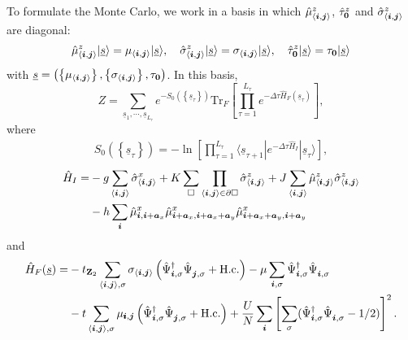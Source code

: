To formulate the Monte Carlo, we work in a basis in which  $\hat{\mu}^{z}_{ \langle  \boldsymbol{i}, \boldsymbol{j} \rangle }$,  $ \hat{\tau}^{z}_{   \boldsymbol{0} } $  and  $ \hat{\sigma}^{z}_{ \langle  \boldsymbol{i}, \boldsymbol{j} \rangle }$    are diagonal: 
\begin{align}
	  \hat{\mu}^{z}_{ \langle  \boldsymbol{i}, \boldsymbol{j} \rangle } |  \underline{s} \rangle  =  \mu_{ \langle  \boldsymbol{i}, \boldsymbol{j} \rangle }   |  \underline{s} \rangle,\quad 
	 \hat{\sigma}^{z}_{ \langle  \boldsymbol{i}, \boldsymbol{j} \rangle }|  \underline{s} \rangle  =  \sigma_{ \langle  \boldsymbol{i}, \boldsymbol{j} \rangle } |  \underline{s} \rangle,\quad    
	  \hat{\tau}^{z}_{   \boldsymbol{0} }  |  \underline{s} \rangle   =  \tau_{  \boldsymbol{0} } |  \underline{s} \rangle
\end{align}
with $ \underline{s} = \left( \left\{  \mu_{ \langle  \boldsymbol{i}, \boldsymbol{j} \rangle }  \right\},  \left\{  \sigma_{ \langle  \boldsymbol{i}, \boldsymbol{j} \rangle }  \right\},  \tau_{\boldsymbol{0}}  \right) $. 
In this basis,
\begin{equation}
   Z  =  \sum_{\underline {s}_1, \cdots, \underline {s}_{L_{\tau}}}  e^{-S_0( \left\{ \underline{s}_\tau \right\})} \text{Tr}_F   \left[    \prod_{\tau=1}^{L_{\tau}} e^{- \Delta \tau \hat{H}_F(\underline{s}_{\tau}) } \right],
 \end{equation}
 where 
 \begin{align*}
 	 S_0( \left\{ \underline{s}_\tau \right\})  = - \ln  \left[  \prod_{\tau=1}^{L_{\tau}}    \langle \underline{s}_{\tau+1}   |  e^{-\Delta \tau   \hat{H}_I} |  \underline{s}_{\tau}  \rangle  \right], 
\end{align*}
\begin{align*}
         \hat{H}_I  = &  -g \sum_{\langle \boldsymbol{i}, \boldsymbol{j} \rangle } \hat{\sigma}^{x}_{\langle \boldsymbol{i}, \boldsymbol{j} \rangle }  +
	                        K \sum_{\square} \prod_{\langle \boldsymbol{i}, \boldsymbol{j} \rangle \in \partial \square} \hat{\sigma}^{z}_{\langle \boldsymbol{i}, \boldsymbol{j} \rangle}  
	     + J  \sum_{\langle \boldsymbol{i}, \boldsymbol{j} \rangle}  \hat{\mu}^z_{ \langle \pmb{i}, \boldsymbol{j} \rangle }  \hat{\sigma}^{z}_{\langle \boldsymbol{i}, \boldsymbol{j} \rangle}     \\
	     & -  h \sum_{ \boldsymbol{i} } \hat{\mu}^{x}_{\boldsymbol{i},\boldsymbol{i} + \boldsymbol{a}_x } \hat{\mu}^{x}_{\boldsymbol{i} + \boldsymbol{a}_x, \boldsymbol{i} + \boldsymbol{a}_x + \boldsymbol{a}_y }   \hat{\mu}^{x}_{\boldsymbol{i} + \boldsymbol{a}_x + \boldsymbol{a}_y, \boldsymbol{i} + \boldsymbol{a}_y}  	
\end{align*}
and 
 \begin{align*}
   \hat{H}_F(\underline{s})  = 
   	     & - t_{\Ztwo} \sum_{\langle \vec{i}, \vec{j} \rangle, \sigma } \sigma_{\langle \vec{i}, \vec{j} \rangle}
	\left(\hat{\Psi}^{\dagger}_{\vec{i},\sigma} \hat{\Psi}^{\phantom{\dagger}}_{\vec{j},\sigma}   + \hc \right) - \mu \sum_{\vec{i},\sigma} \hat{\Psi}^{\dagger}_{\vec{i},\sigma} \hat{\Psi}^{\phantom{\dagger}}_{\vec{i},\sigma}  \\
         & - t  \sum_{\langle \vec{i}, \vec{j} \rangle, \sigma }   \mu_{\pmb{i},\ve{j}}    \left( \hat{\Psi}^{\dagger}_{\vec{i},\sigma} \hat{\Psi}^{\phantom{\dagger}}_{\vec{j},\sigma} 	+ \hc \right)  
         +\frac{U}{N}\sum_{\ve{i}} \left[ \sum_{\sigma}  ( \hat{\Psi}^{\dagger}_{\ve{i},\sigma}  \hat{\Psi}^{\phantom\dagger}_{\ve{i},\sigma} - 1/2 ) \right]^2. 
 \end{align*}
